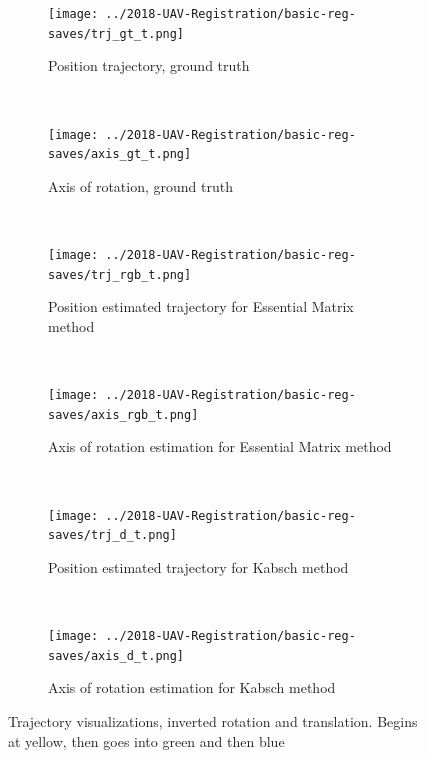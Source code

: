 \documentclass[12pt,a4paper]{article}
\begin{document}
\begin{figure}[p]
  \centering
  \begin{subfigure}[t]{0.5\textwidth}
  \centering
    \texttt{[image: ../2018-UAV-Registration/basic-reg-saves/trj\_gt\_t.png]}
  \caption{Position trajectory, ground truth}
  \end{subfigure}%
  ~
  \begin{subfigure}[t]{0.5\textwidth}
  \centering
    \texttt{[image: ../2018-UAV-Registration/basic-reg-saves/axis\_gt\_t.png]}
  \caption{Axis of rotation, ground truth}
  \end{subfigure}
  \\
  \begin{subfigure}[t]{0.5\textwidth}
  \centering
    \texttt{[image: ../2018-UAV-Registration/basic-reg-saves/trj\_rgb\_t.png]}
  \caption{Position estimated trajectory for Essential Matrix method}
  \end{subfigure}%
  ~
  \begin{subfigure}[t]{0.5\textwidth}
  \centering
    \texttt{[image: ../2018-UAV-Registration/basic-reg-saves/axis\_rgb\_t.png]}
  \caption{Axis of rotation estimation for Essential Matrix method}
  \end{subfigure}
  \\
  \begin{subfigure}[t]{0.5\textwidth}
  \centering
    \texttt{[image: ../2018-UAV-Registration/basic-reg-saves/trj\_d\_t.png]}
  \caption{Position estimated trajectory for Kabsch method}
  \end{subfigure}%
  ~
  \begin{subfigure}[t]{0.5\textwidth}
  \centering
    \texttt{[image: ../2018-UAV-Registration/basic-reg-saves/axis\_d\_t.png]}
  \caption{Axis of rotation estimation for Kabsch method}
  \end{subfigure}
  \caption{Trajectory visualizations, inverted rotation and translation. Begins at yellow, then goes into green and then blue}
  \label{f: D415 offset}
\end{figure}
\end{document}
